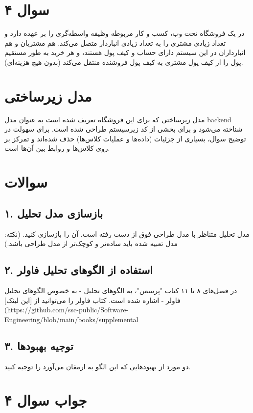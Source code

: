 \section*{سوال ۴}

در یک فروشگاه تحت وب، کسب و کار مربوطه وظیفه واسطه‌گری را بر عهده دارد و تعداد زیادی مشتری را به تعداد زیادی انباردار متصل می‌کند. هم مشتریان و هم انبارداران در این سیستم دارای حساب و کیف پول هستند، و هر خرید به طور مستقیم پول را از کیف پول مشتری به کیف پول فروشنده منتقل می‌کند (بدون هیچ هزینه‌ای).

\section*{مدل زیرساختی}
مدل زیرساختی که برای این فروشگاه تعریف شده است به عنوان مدل backend شناخته می‌شود و برای بخشی از کد زیرسیستم طراحی شده است. برای سهولت در توضیح سوال، بسیاری از جزئیات (داده‌ها و عملیات کلاس‌ها) حذف شده‌اند و تمرکز بر روی کلاس‌ها و روابط بین آن‌ها است.

\section*{سوالات}
\subsection*{۱. بازسازی مدل تحلیل}
مدل تحلیل متناظر با مدل طراحی فوق از دست رفته است. آن را بازسازی کنید. (نکته: مدل تعبیه شده باید ساده‌تر و کوچک‌تر از مدل طراحی باشد.)

\subsection*{۲. استفاده از الگوهای تحلیل فاولر}
در فصل‌های ۸ تا ۱۱ کتاب "پرسمن"، به الگوهای تحلیل - به خصوص الگوهای تحلیل فاولر - اشاره شده است. کتاب فاولر را می‌توانید از [این لینک](https://github.com/ssc-public/Software-Engineering/blob/main/books/supplemental%

\subsection*{۳. توجیه بهبود‌ها}
دو مورد از بهبود‌هایی که این الگو به ارمغان می‌آورد را توجیه کنید.

\section*{جواب سوال ۴}

